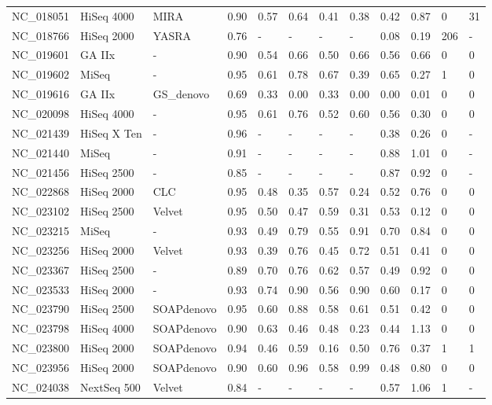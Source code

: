 \begin{table}[ht]
\begin{tabular}{llllllllllll}
  NC\_018051 & HiSeq 4000 & MIRA & 0.90 & 0.57 & 0.64 & 0.41 & 0.38 & 0.42 & 0.87 &   0 &    31 \\ 
  NC\_018766 & HiSeq 2000 & YASRA & 0.76 & - & - & - & - & 0.08 & 0.19 & 206 & - \\ 
  NC\_019601 & GA IIx & - & 0.90 & 0.54 & 0.66 & 0.50 & 0.66 & 0.56 & 0.66 &   0 &     0 \\ 
  NC\_019602 & MiSeq & - & 0.95 & 0.61 & 0.78 & 0.67 & 0.39 & 0.65 & 0.27 &   1 &     0 \\ 
  NC\_019616 & GA IIx & GS\_denovo & 0.69 & 0.33 & 0.00 & 0.33 & 0.00 & 0.00 & 0.01 &   0 &     0 \\ 
  NC\_020098 & HiSeq 4000 & - & 0.95 & 0.61 & 0.76 & 0.52 & 0.60 & 0.56 & 0.30 &   0 &     0 \\ 
  NC\_021439 & HiSeq X Ten & - & 0.96 & - & - & - & - & 0.38 & 0.26 &   0 & - \\ 
  NC\_021440 & MiSeq & - & 0.91 & - & - & - & - & 0.88 & 1.01 &   0 & - \\ 
  NC\_021456 & HiSeq 2500 & - & 0.85 & - & - & - & - & 0.87 & 0.92 &   0 & - \\ 
  NC\_022868 & HiSeq 2000 & CLC & 0.95 & 0.48 & 0.35 & 0.57 & 0.24 & 0.52 & 0.76 &   0 &     0 \\ 
  NC\_023102 & HiSeq 2500 & Velvet & 0.95 & 0.50 & 0.47 & 0.59 & 0.31 & 0.53 & 0.12 &   0 &     0 \\ 
  NC\_023215 & MiSeq & - & 0.93 & 0.49 & 0.79 & 0.55 & 0.91 & 0.70 & 0.84 &   0 &     0 \\ 
  NC\_023256 & HiSeq 2000 & Velvet & 0.93 & 0.39 & 0.76 & 0.45 & 0.72 & 0.51 & 0.41 &   0 &     0 \\ 
  NC\_023367 & HiSeq 2500 & - & 0.89 & 0.70 & 0.76 & 0.62 & 0.57 & 0.49 & 0.92 &   0 &     0 \\ 
  NC\_023533 & HiSeq 2000 & - & 0.93 & 0.74 & 0.90 & 0.56 & 0.90 & 0.60 & 0.17 &   0 &     0 \\ 
  NC\_023790 & HiSeq 2500 & SOAPdenovo & 0.95 & 0.60 & 0.88 & 0.58 & 0.61 & 0.51 & 0.42 &   0 &     0 \\ 
  NC\_023798 & HiSeq 4000 & SOAPdenovo & 0.90 & 0.63 & 0.46 & 0.48 & 0.23 & 0.44 & 1.13 &   0 &     0 \\ 
  NC\_023800 & HiSeq 2000 & SOAPdenovo & 0.94 & 0.46 & 0.59 & 0.16 & 0.50 & 0.76 & 0.37 &   1 &     1 \\ 
  NC\_023956 & HiSeq 2000 & SOAPdenovo & 0.90 & 0.60 & 0.96 & 0.58 & 0.99 & 0.48 & 0.80 &   0 &     0 \\ 
  NC\_024038 & NextSeq 500 & Velvet & 0.84 & - & - & - & - & 0.57 & 1.06 &   1 & - \\ 

\end{tabular}
\end{table}

